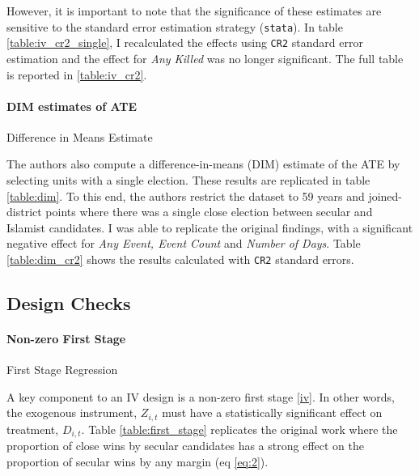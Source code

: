 \documentclass{scrartcl}
\begin{document}
However, it is important to note that the significance of these estimates are sensitive to the standard error estimation strategy (\texttt{stata}).
In table \ref{table:iv_cr2_single}, I recalculated the effects using \texttt{CR2} standard error estimation and the effect for \textit{Any Killed} was no longer significant. The full table is reported in \ref{table:iv_cr2}.

\paragraph{DIM estimates of ATE}

\begin{table}[h!]
  \begin{center}
    \scalebox{0.75}{
      
    }
    \caption{Difference in Means Estimate}
    \label{table:dim}
  \end{center}
\end{table}

The authors also compute a difference-in-means (DIM) estimate of the ATE by selecting units with a single election. 
These results are replicated in table \ref{table:dim}.
To this end, the authors restrict the dataset to 59 years and joined-district points where there was a single close election between secular and Islamist candidates. I was able to replicate the original findings, with a significant negative effect for \textit{Any Event, Event Count} and \textit{Number of Days}.
Table \ref{table:dim_cr2} shows the results calculated with \texttt{CR2} standard errors. 

\subsection{Design Checks}
\paragraph{Non-zero First Stage}

\begin{table}[ht]
  \begin{center}
    \scalebox{0.85}{
      
    }
    \caption{First Stage Regression}
    \label{table:first_stage}
  \end{center}
\end{table}

A key component to an IV design is a non-zero first stage \ref{iv}. In other words, the exogenous instrument, $Z_{i,t}$ must have a statistically significant effect on treatment, $D_{i,t}$.
Table \ref{table:first_stage} replicates the original work where the proportion of close wins by secular candidates has a strong effect on the proportion of secular wins by any margin (eq \ref{eq:2}).
\end{document}
